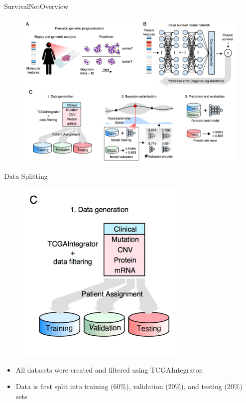 \documentclass[
]{beamer}
\begin{document}
\begin{frame}[plain]{SurvivalNet}{Overview}
\begin{figure}
	\centering
	\includegraphics[scale=0.45]{snover}
\end{figure}
\end{frame}


\begin{frame}[plain]{Data Splitting}
\begin{figure}
	\centering
	\includegraphics[scale=0.45]{split}
\end{figure}
\begin{itemize}
	\item All datasets were created and filtered using TCGAIntegrator.
	\item Data is first split into training (60\%), validation (20\%), and
	testing (20\%) sets
\end{itemize}
\end{frame}
\end{document}
